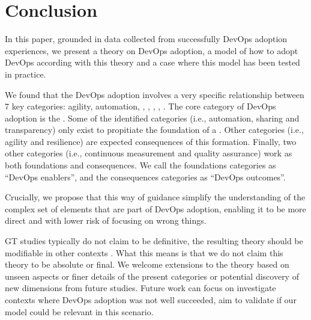 \section{Conclusion} \label{sec:conclusion}

In this paper, grounded in data collected from successfully DevOps adoption
experiences, we present a theory on DevOps adoption, a model of how to adopt
DevOps according with this theory and a case where this model has been tested
in practice.

We found that the DevOps adoption involves a very specific relationship between
7 key categories: agility, automation, \cc, , , , .
The core category of DevOps adoption is the \cc. Some of the
identified categories (i.e., automation, sharing and transparency) only exist
to propitiate the foundation of a \cc. Other categories
(i.e., agility and resilience) are expected consequences of this formation.
Finally, two other categories (i.e., continuous measurement and quality
assurance) work as both foundations and consequences. We call the foundations
categories as ``DevOps enablers'', and the consequences categories as ``DevOps outcomes''.

Crucially, we propose that this way of guidance simplify the understanding of the
complex set of elements that are part of DevOps adoption, enabling it to be
more direct and with lower risk of focusing on wrong things.

GT studies typically do not claim to be definitive, the resulting theory should
be modifiable in other contexts \cite{}. What this means is that we do not claim
this theory to be absolute or final. We welcome extensions to the theory based
on unseen aspects or finer details of the present categories or potential discovery
of new dimensions from future studies. Future work can focus on investigate contexts
where DevOps adoption was not well succeeded, aim to validate if our model could be
relevant in this scenario.
